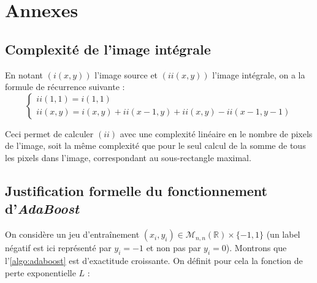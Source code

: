 \documentclass[12pt,a4paper]{article}
\begin{document}
\section{Annexes}
%

\subsection{Complexité de l'image intégrale}
En notant $(i(x, y))$ l'image source et $(ii(x, y))$ l'image intégrale, on a la formule de récurrence suivante :
\begin{equation}
    \begin{cases}
        ii(1, 1) = i(1, 1) \\
        ii(x, y) = i(x, y) + ii(x-1, y) + ii(x, y) - ii(x-1, y-1)
    \end{cases}
\end{equation}

Ceci permet de calculer $(ii)$ avec une complexité linéaire en le nombre de pixels de l'image, soit la même complexité que pour le seul calcul de la somme de tous les pixels dans l'image, correspondant au sous-rectangle maximal.

\subsection{Justification formelle du fonctionnement d'\textit{AdaBoost}}
\label{sec:preuve-boost}
On considère un jeu d'entraînement $(x_i, y_i) \in \mathscr{M}_{n, n}(\mathbb{R})\times \{-1, 1\}$ (un label négatif est ici représenté par $y_i = -1$ et non pas par $y_i = 0$). Montrons que l'\autoref{algo:adaboost} est d'exactitude croissante. On définit pour cela la fonction de perte exponentielle $L$ \cite{wang} :
\end{document}
